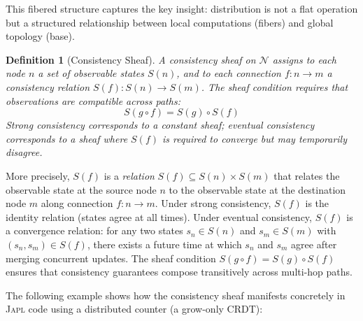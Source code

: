 \documentclass[11pt,a4paper]{article}
\newtheorem{definition}[theorem]{Definition}
\newcommand{\japl}{\textsc{Japl}}
\newcommand{\catN}{\mathcal{N}}
\begin{document}
This fibered structure captures the key insight: distribution is not a
flat operation but a structured relationship between local computations
(fibers) and global topology (base).

\begin{definition}[Consistency Sheaf]
A \emph{consistency sheaf} on $\catN$ assigns to each node $n$ a set of
observable states $S(n)$, and to each connection $f : n \to m$ a
consistency relation $S(f) : S(n) \to S(m)$. The sheaf condition requires
that observations are compatible across paths:
\[
  S(g \circ f) = S(g) \circ S(f)
\]
Strong consistency corresponds to a constant sheaf; eventual consistency
corresponds to a sheaf where $S(f)$ is required to converge but may
temporarily disagree.
\end{definition}

More precisely, $S(f)$ is a \emph{relation} $S(f) \subseteq S(n) \times S(m)$
that relates the observable state at the source node $n$ to the observable state
at the destination node $m$ along connection $f : n \to m$. Under strong
consistency, $S(f)$ is the identity relation (states agree at all times). Under
eventual consistency, $S(f)$ is a convergence relation: for any two states
$s_n \in S(n)$ and $s_m \in S(m)$ with $(s_n, s_m) \in S(f)$, there exists a
future time at which $s_n$ and $s_m$ agree after merging concurrent updates.
The sheaf condition $S(g \circ f) = S(g) \circ S(f)$ ensures that consistency
guarantees compose transitively across multi-hop paths.

The following example shows how the consistency sheaf manifests concretely in
\japl{} code using a distributed counter (a grow-only CRDT):
\end{document}
